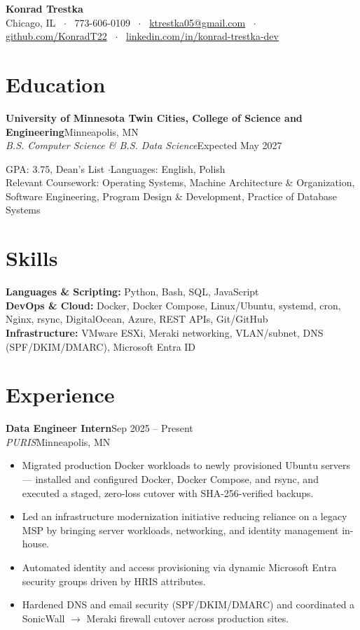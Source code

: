 \documentclass[letterpaper,10.5pt]{article}
\newcommand{\entry}[4]{\textbf{#1}\hfill{\small #2}\\\textit{\small #3}\hfill{\small #4}\par\vspace{1pt}}
\begin{document}
{\centering
{\LARGE\bfseries Konrad Trestka}\\[3pt]
{\small Chicago, IL ~$\cdot$~ 773-606-0109 ~$\cdot$~ \href{mailto:ktrestka05@gmail.com}{ktrestka05@gmail.com} ~$\cdot$~ \href{https://github.com/KonradT22}{github.com/KonradT22} ~$\cdot$~ \href{https://www.linkedin.com/in/konrad-trestka-dev}{linkedin.com/in/konrad-trestka-dev}}\par}
\vspace{2pt}

\section{Education}
\entry{University of Minnesota Twin Cities, College of Science and Engineering}{Minneapolis, MN}{B.S. Computer Science \& B.S. Data Science}{Expected May 2027}
{\small GPA: 3.75, Dean's List \quad$\cdot$\quad Languages: English, Polish \\
Relevant Coursework: Operating Systems, Machine Architecture \& Organization, Software Engineering, Program Design \& Development, Practice of Database Systems}

\section{Skills}
{\small \textbf{Languages \& Scripting:} Python, Bash, SQL, JavaScript \\
\textbf{DevOps \& Cloud:} Docker, Docker Compose, Linux/Ubuntu, systemd, cron, Nginx, rsync, DigitalOcean, Azure, REST APIs, Git/GitHub \\
\textbf{Infrastructure:} VMware ESXi, Meraki networking, VLAN/subnet, DNS (SPF/DKIM/DMARC), Microsoft Entra ID}

\section{Experience}
\entry{Data Engineer Intern}{Sep 2025 -- Present}{PURIS}{Minneapolis, MN}
\begin{itemize}
  \item Migrated production Docker workloads to newly provisioned Ubuntu servers --- installed and configured Docker, Docker Compose, and rsync, and executed a staged, zero-loss cutover with SHA-256-verified backups.
  \item Led an infrastructure modernization initiative reducing reliance on a legacy MSP by bringing server workloads, networking, and identity management in-house.
  \item Automated identity and access provisioning via dynamic Microsoft Entra security groups driven by HRIS attributes.
  \item Hardened DNS and email security (SPF/DKIM/DMARC) and coordinated a SonicWall $\rightarrow$ Meraki firewall cutover across production sites.
\end{itemize}
\end{document}
